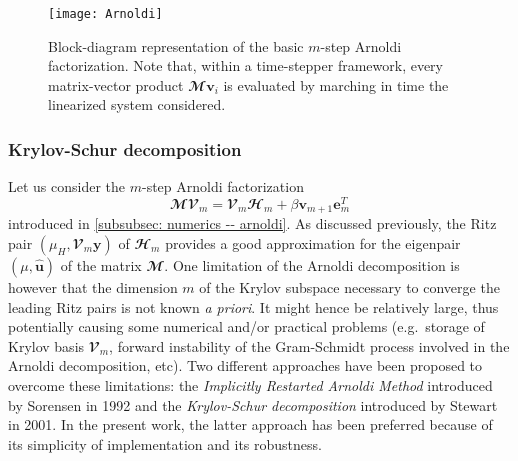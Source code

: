     \begin{figure}[b]
      \centering
      \texttt{[image: Arnoldi]}
      \caption{Block-diagram representation of the basic $m$-step Arnoldi factorization. Note that, within a time-stepper framework, every matrix-vector product $\mathbfcal{M} \mathbf{v}_i$ is evaluated by marching in time the linearized system considered.}
      \label{fig: numerics -- arnoldi decomposition}
    \end{figure}

    \subsubsection{Krylov-Schur decomposition}
    \label{subsubsec: numerics -- krylov-schur}

    Let us consider the $m$-step Arnoldi factorization
    \begin{equation}
      \mathbfcal{MV}_m = \mathbfcal{V}_m \mathbfcal{H}_m + \beta \mathbf{v}_{m+1} \mathbf{e}^T_m
      \label{eq: m-step Arnoldi}
    \end{equation}
    introduced in \textsection \ref{subsubsec: numerics -- arnoldi}. As discussed previously, the Ritz pair $\left( \mu_H, \mathbfcal{V}_m \mathbf{y} \right)$ of $\mathbfcal{H}_m$ provides a good approximation for the eigenpair $\left( \mu, \hat{\mathbf u} \right)$ of the matrix $\mathbfcal{M}$. One limitation of the Arnoldi decomposition is however that the dimension $m$ of the Krylov subspace necessary to converge the leading Ritz pairs is not known \emph{a priori}. It might hence be relatively large, thus potentially causing some numerical and/or practical problems (e.g.\ storage of Krylov basis $\mathbfcal{V}_m$, forward instability of the Gram-Schmidt process involved in the Arnoldi decomposition, etc). Two different approaches have been proposed to overcome these limitations: the \emph{Implicitly Restarted Arnoldi Method} introduced by Sorensen \cite{Sorensen_SIAM_1992} in 1992 and the \emph{Krylov-Schur decomposition} introduced by Stewart \cite{Stewart_SIAM_2001} in 2001. In the present work, the latter approach has been preferred because of its simplicity of implementation and its robustness.

